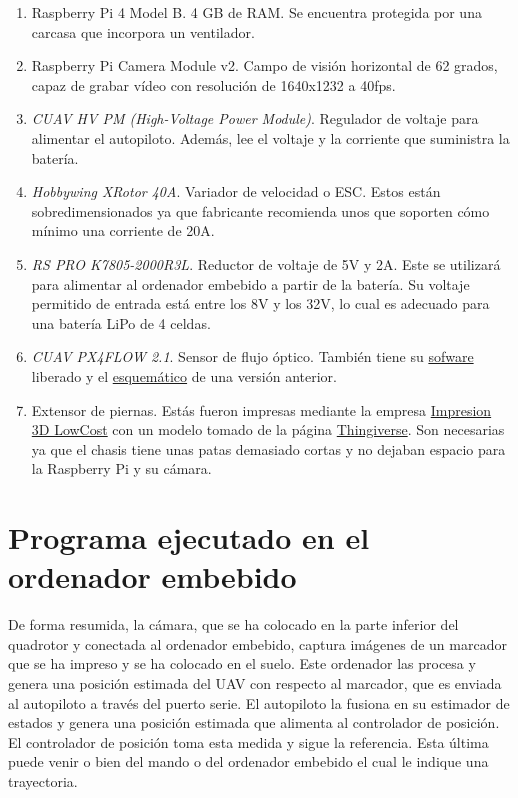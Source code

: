 \begin{enumerate}
\item Raspberry Pi 4 Model B. 4 GB de RAM. Se encuentra protegida por una carcasa que incorpora un ventilador. 
\item Raspberry Pi Camera Module v2. Campo de visión horizontal de 62 grados, capaz de grabar vídeo con resolución de 1640x1232 a 40fps.
\item \textit{CUAV HV PM (High-Voltage Power Module)}. Regulador de voltaje para alimentar el autopiloto. Además, lee el voltaje y la corriente que suministra la batería. 
\item \textit{Hobbywing XRotor 40A}. Variador de velocidad o ESC. Estos están sobredimensionados ya que fabricante recomienda unos que soporten cómo mínimo una corriente de 20A.
\item \textit{RS PRO K7805-2000R3L}. Reductor de voltaje de 5V y 2A. Este se utilizará para alimentar al ordenador embebido a partir de la batería. Su voltaje permitido de entrada está entre los 8V y los 32V, lo cual es adecuado para una batería LiPo de 4 celdas. 
\item \textit{CUAV PX4FLOW 2.1}. Sensor de flujo óptico. También tiene su \href{https://github.com/PX4/PX4-Flow}{sofware} liberado y el \href{https://github.com/pixhawk/Hardware/tree/master/FLOWv1}{esquemático} de una versión anterior.
\item Extensor de piernas. Estás fueron impresas mediante la empresa \href{https://impresion3dlowcost.es/}{Impresion 3D LowCost} con un modelo tomado de la página \href{https://www.thingiverse.com/thing:915639}{Thingiverse}. Son necesarias ya que el chasis tiene unas patas demasiado cortas y no dejaban espacio para la Raspberry Pi y su cámara. 
\end{enumerate}



\section{Programa ejecutado en el ordenador embebido}\label{sec:programa}
De forma resumida, la cámara, que se ha colocado en la parte inferior del quadrotor y conectada al ordenador embebido, captura imágenes de un marcador que se ha impreso y se ha colocado en el suelo. Este ordenador las procesa y genera una posición estimada del UAV con respecto al marcador, que es enviada al autopiloto a través del puerto serie. El autopiloto la fusiona en su estimador de estados y genera una posición estimada que alimenta al controlador de posición.  El controlador de posición toma esta medida y sigue la referencia. Esta última puede venir o bien del mando o del ordenador embebido el cual le indique una trayectoria.

